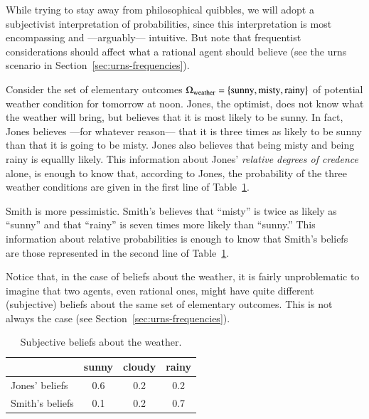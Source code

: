 \documentclass[nobib,nofonts]{tufte-handout}
\begin{document}
While trying to stay away from philosophical quibbles, we will adopt a subjectivist interpretation of probabilities, since this interpretation is most encompassing and ---arguably--- intuitive.
But note that frequentist considerations should affect what a rational agent should believe (see the urns scenario in Section~\ref{sec:urns-frequencies}).

\begin{example}
  Consider the set of elementary outcomes $\Omega_{\text{weather}} = \left\{\text{sunny}, \text{misty}, \text{rainy}\right\}$ of potential weather condition for tomorrow at noon.
Jones, the optimist, does not know what the weather will bring, but believes that it is most likely to be sunny.
In fact, Jones believes ---for whatever reason--- that it is three times as likely to be sunny than that it is going to be misty.
Jones also believes that being misty and being rainy is equallly likely.
This information about Jones' \emph{relative degrees of credence} alone, is enough to know that, according to Jones, the probability of the three weather conditions are given in the first line of Table~\ref{tab:beliefs-weather}.

Smith is more pessimistic.
Smith's believes that ``misty'' is twice as likely as ``sunny'' and that ``rainy'' is seven times more likely than ``sunny.''
This information about relative probabilities is enough to know that Smith's beliefs are those represented in the second line of Table~\ref{tab:beliefs-weather}.

Notice that, in the case of beliefs about the weather, it is fairly unproblematic to imagine that two agents, even rational ones, might have quite different (subjective) beliefs about the same set of elementary outcomes.
This is not always the case (see Section~\ref{sec:urns-frequencies}).

\begin{table}
  \centering
  \begin{tabular}{lccc}
    & sunny & cloudy & rainy \\ \midrule
    Jones' beliefs  & 0.6   & 0.2    & 0.2   \\
    Smith's beliefs & 0.1   & 0.2    & 0.7   \\
  \end{tabular}

  \caption{Subjective beliefs about the weather.}
  \label{tab:beliefs-weather}
\end{table}
\end{example}
\end{document}
